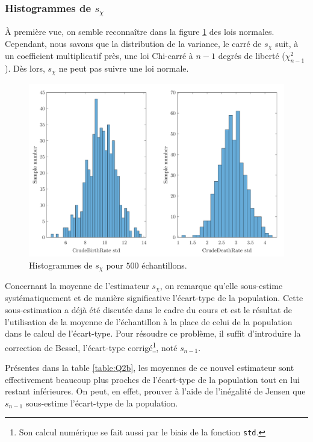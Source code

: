 \documentclass[a4paper, 12pt]{article}
\begin{document}
	\subsubsection{Histogrammes de $s_{\chi}$} \label{sec:Q2biii}
	À première vue, on semble reconnaître dans la figure \ref{figure:Q2biii} des lois normales. Cependant, nous savons que la distribution de la variance, \cad le carré de $s_{\chi}$ suit, à un coefficient multiplicatif près, une loi Chi-carré à $n - 1$ degrés de liberté ($\chi^2_{n-1}$). Dès lors, $s_{\chi}$ ne peut pas suivre une loi normale. \par
	\begin{figure}[h!]
		\centering
		\includegraphics[scale=0.24]{resources/pdf/q2biii.pdf}
		\caption{Histogrammes de $s_{\chi}$ pour $500$ échantillons.}
		\label{figure:Q2biii}
	\end{figure}
	Concernant la moyenne de l'estimateur $s_{\chi}$, on remarque qu'elle sous-estime systématiquement et de manière significative l'écart-type de la population. Cette sous-estimation a déjà été discutée dans le cadre du cours et est le résultat de l'utilisation de la moyenne de l'échantillon à la place de celui de la population dans le calcul de l'écart-type. Pour résoudre ce problème, il suffit d'introduire la correction de Bessel, \cad l'écart-type corrigé\footnote{Son calcul numérique se fait aussi par le biais de la fonction \texttt{std}.}, noté $s_{n-1}$. \par
	Présentes dans la table \ref{table:Q2b}, les moyennes de ce nouvel estimateur sont effectivement beaucoup plus proches de l'écart-type de la population tout en lui restant inférieures. On peut, en effet, prouver à l'aide de l'inégalité de Jensen que $s_{n-1}$ sous-estime l'écart-type de la population.
\end{document}
